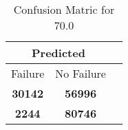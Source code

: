 \begin{table}[] 
\caption{Confusion Matric for 70.0} 
\label{Table: Prediction Accuracy-DMD70.0OnlySunEKF-ignoreReflectionEKF-top2-Reflection} 
\centering 
\begin{tabular} 
 {@{}ccc@{}} 
\toprule 
\multicolumn{2}{c}{\textbf{Predicted}}
 \\ \midrule 
\multicolumn{1}{|c|}{Failure} & 
\multicolumn{1}{c|}{No Failure}
 \\ \midrule 
\multicolumn{1}{|c|}{\color{green}\textbf{30142}} & 
\multicolumn{1}{c|}{\color{red}\textbf{56996}}
 \\ \midrule 
\multicolumn{1}{|c|}{\color{red}\textbf{2244}} & 
\multicolumn{1}{c|}{\color{green}\textbf{80746}}
 \\ \bottomrule 
\end{tabular} 
\end{table} 
